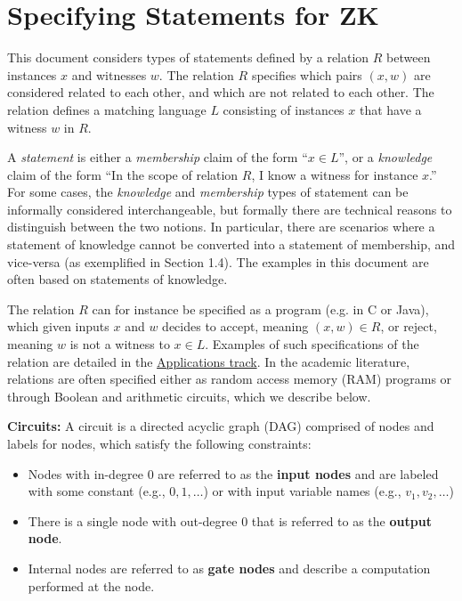 \section{Specifying Statements for ZK}
\label{security:spec-statements-ZK}

 
	This document considers types of statements defined by a relation $R$ between instances $x$ and witnesses $w$.
	The relation $R$ specifies which pairs $(x,w)$ are considered related to each other, and which are not related to each other.
	The relation defines a matching language $L$ consisting of instances $x$ that have a witness $w$ in $R$.

	A \emph{statement} is either a \emph{membership} claim of the form ``$x \in L$'', 
or a \emph{knowledge} claim of the form ``In the scope of relation $R$, I know a witness for instance $x$.''
	For some cases, the \emph{knowledge} and \emph{membership} types of statement can be informally considered interchangeable, but formally there are technical reasons to distinguish between the two notions.
	In particular, there are scenarios where a statement of knowledge cannot be converted into a statement of membership, and vice-versa (as exemplified in Section 1.4).
	The examples in this document are often based on statements of knowledge.
	

 
	The relation $R$ can for instance be specified as a program (e.g. in C or Java), which given inputs $x$ and $w$ decides to accept, meaning $(x,w) \in R$, or reject, meaning $w$ is not a witness to $x \in L$. 
	Examples of such specifications of the relation are detailed in the \hyperref[chap:apps]{Applications track}.
	In the academic literature, relations are often specified either as 
random access memory (RAM)
programs or through %
Boolean
and arithmetic circuits, which we describe below.


\textbf{Circuits:} A circuit is a directed acyclic graph (DAG) comprised of nodes and labels for nodes, which satisfy the following constraints:
\begin{itemize}
\item Nodes with in-degree 0 are referred to as the \textbf{input nodes} and are labeled with some constant (e.g., $0, 1, \ldots$) or with input variable names (e.g., $v_1, v_2, \ldots$)
\item There is a single node with out-degree 0 that is referred to as the \textbf{output node}.
\item Internal nodes %
are 
referred to as \textbf{gate nodes} and %
describe a computation %
performed at the node.\loosen
\end{itemize}


